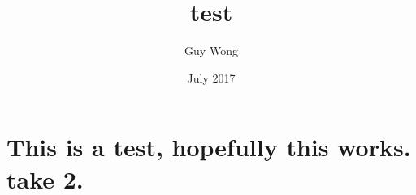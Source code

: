 \documentclass{article}
\title{test}
\author{Guy Wong}
\date{July 2017}
\begin{document}
\maketitle

\section{This is a test, hopefully this works. take 2.}
\end{document}
